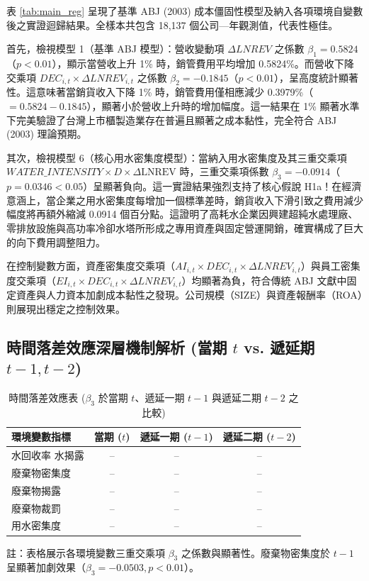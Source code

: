 \documentclass[12pt,a4paper]{article}
\begin{document}
表 \ref{tab:main_reg} 呈現了基準 ABJ (2003) 成本僵固性模型及納入各項環境自變數後之實證迴歸結果。全樣本共包含 18,137 個公司—年觀測值，代表性極佳。

首先，檢視模型 1（基準 ABJ 模型）：營收變動項 $\Delta LNREV$ 之係數 $\beta_1 = 0.5824$（$p < 0.01$），顯示當營收上升 1\% 時，銷管費用平均增加 0.5824\%。而營收下降交乘項 $DEC_{i,t} \times \Delta LNREV_{i,t}$ 之係數 $\beta_2 = -0.1845$（$p < 0.01$），呈高度統計顯著性。這意味著當銷貨收入下降 1\% 時，銷管費用僅相應減少 0.3979\%（$= 0.5824 - 0.1845$），顯著小於營收上升時的增加幅度。這一結果在 1\% 顯著水準下完美驗證了台灣上市櫃製造業存在普遍且顯著之成本黏性，完全符合 ABJ (2003) 理論預期。

其次，檢視模型 6（核心用水密集度模型）：當納入用水密集度及其三重交乘項 $WATER\_INTENSITY \times D \times \Delta\text{LNREV}$ 時，三重交乘項係數 $\beta_3 = -0.0914$（$p = 0.0346 < 0.05$）呈顯著負向。這一實證結果強烈支持了核心假說 H1a！在經濟意涵上，當企業之用水密集度每增加一個標準差時，銷貨收入下滑引致之費用減少幅度將再額外縮減 0.0914 個百分點。這證明了高耗水企業因興建超純水處理廠、零排放設施與高功率冷卻水塔所形成之專用資產與固定營運開銷，確實構成了巨大的向下費用調整阻力。

在控制變數方面，資產密集度交乘項（$AI_{i,t} \times DEC_{i,t} \times \Delta LNREV_{i,t}$）與員工密集度交乘項（$EI_{i,t} \times DEC_{i,t} \times \Delta LNREV_{i,t}$）均顯著為負，符合傳統 ABJ 文獻中固定資產與人力資本加劇成本黏性之發現。公司規模（SIZE）與資產報酬率（ROA）則展現出穩定之控制效果。

\subsection{時間落差效應深層機制解析 (當期 $t$ vs. 遞延期 $t-1, t-2$)}

\begin{table}[H]
\centering
\caption{時間落差效應表 ($\beta_3$ 於當期 $t$、遞延一期 $t-1$ 與遞延二期 $t-2$ 之比較)}
\label{tab:lag_reg}
\begin{threeparttable}
\small
\begin{tabular}{lccc}
\toprule
環境變數指標 & 當期 ($t$) & 遞延一期 ($t-1$) & 遞延二期 ($t-2$) \\
\midrule
水回收率%
水揭露 & -- & -- & -- \\
廢棄物密集度 & -- & -- & -- \\
廢棄物揭露 & -- & -- & -- \\
廢棄物裁罰 & -- & -- & -- \\
用水密集度 & -- & -- & -- \\
\bottomrule
\end{tabular}
\begin{tablenotes}
\small
\item 註：表格展示各環境變數三重交乘項 $\beta_3$ 之係數與顯著性。廢棄物密集度於 $t-1$ 呈顯著加劇效果（$\beta_3 = -0.0503, p < 0.01$）。
\end{tablenotes}
\end{threeparttable}
\end{table}
\end{document}
